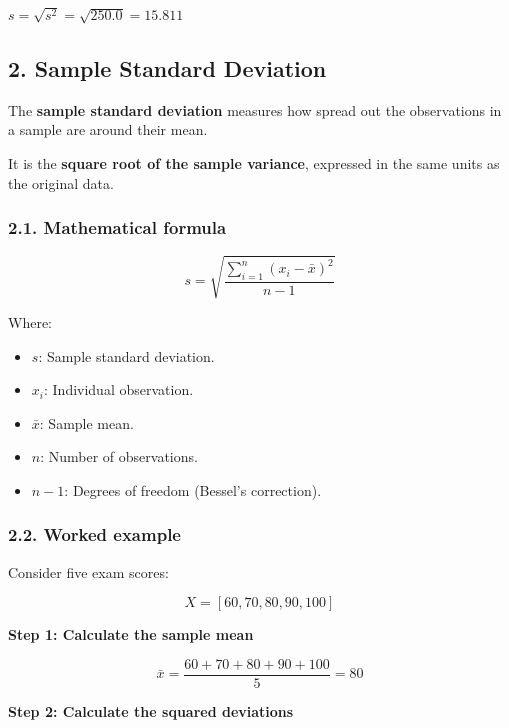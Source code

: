 \documentclass[11pt]{article}
\providecommand{\tightlist}{%
      \setlength{\itemsep}{0pt}\setlength{\parskip}{0pt}}
\begin{document}
    
    $\displaystyle s = \sqrt{s^2} = \sqrt{250.0} = 15.811$

    

    \subsection{2. Sample Standard
Deviation}\label{sample-standard-deviation}

The \textbf{sample standard deviation} measures how spread out the
observations in a sample are around their mean.

It is the \textbf{square root of the sample variance}, expressed in the
same units as the original data.

\subsubsection{2.1. Mathematical formula}\label{mathematical-formula}

\[
\boxed{s = \sqrt{\frac{\sum_{i=1}^{n}(x_i-\bar{x})^2}{n-1}}}
\]

Where:

\begin{itemize}
\tightlist
\item
  \(s\): Sample standard deviation.
\item
  \(x_i\): Individual observation.
\item
  \(\bar{x}\): Sample mean.
\item
  \(n\): Number of observations.
\item
  \(n-1\): Degrees of freedom (Bessel's correction).
\end{itemize}

\subsubsection{2.2. Worked example}\label{worked-example}

Consider five exam scores:

\[
X = [60,70,80,90,100]
\]

\textbf{Step 1: Calculate the sample mean}

\[
\bar{x}=\frac{60+70+80+90+100}{5}=80
\]

\textbf{Step 2: Calculate the squared deviations}
\end{document}

